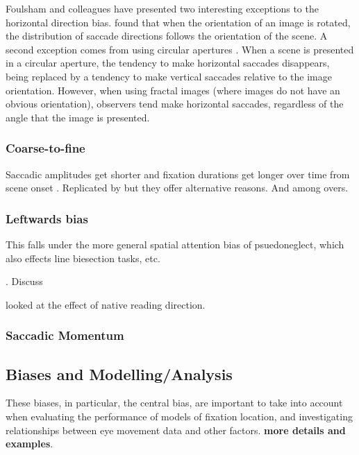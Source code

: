 \documentclass[a4paper, twocolumn, oneside, 10pt]{article}
\begin{document}
Foulsham and colleagues have presented two interesting exceptions to the horizontal direction bias. \cite{Foulsham2008} found that when the orientation of an image is rotated, the distribution of saccade directions follows the orientation of the scene. A second exception comes from using circular apertures \citep{Foulsham-kingstone2010}. When a scene is presented in a circular aperture, the tendency to make horizontal saccades disappears, being replaced by a tendency to make vertical saccades relative to the image orientation. However, when using fractal images (where images do not have an obvious orientation), observers tend make horizontal saccades, regardless of the angle that the image is presented.

\subsubsection{Coarse-to-fine}

Saccadic amplitudes get shorter and fixation durations get longer over time from scene onset \citep{over2007}. Replicated by \cite{godwin2014} but they offer alternative reasons. And \cite{macinnes2014}
among overs. 


\subsubsection{Leftwards bias}

This falls under the more general spatial attention bias of psuedoneglect, which also effects line biesection tasks, etc.

\citep{ossandon2014,nuthmann-matthias2014,learmonth2015}. Discuss 

\cite{friedrich2014} looked at the effect of native reading direction. 

\subsubsection{Saccadic Momentum}

 \cite{macinnes2014, tatler-vincent20xx}

\subsection{Biases and Modelling/Analysis}

These biases, in particular, the central bias, are important to take into account when evaluating the performance of models of fixation location, and investigating relationships between eye movement data and other factors. \textbf{more details and examples}. 
\end{document}
